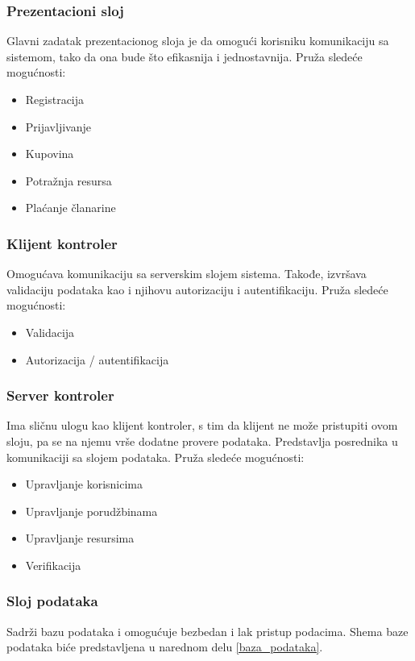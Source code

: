 \documentclass[a4paper]{article}
\begin{document}
\subsubsection{Prezentacioni sloj}
Glavni zadatak prezentacionog sloja je da omogući korisniku komunikaciju sa sistemom, tako da ona bude što efikasnija i jednostavnija. Pruža sledeće mogućnosti:
\begin{itemize}
    \item Registracija
    \item Prijavljivanje
    \item Kupovina
    \item Potražnja resursa
    \item Plaćanje članarine
\end{itemize}

\subsubsection{Klijent kontroler}
Omogućava komunikaciju sa serverskim slojem sistema. Takođe, izvršava validaciju podataka kao i njihovu autorizaciju i autentifikaciju. Pruža sledeće mogućnosti:
\begin{itemize}
    \item Validacija
    \item Autorizacija / autentifikacija
\end{itemize}

\subsubsection{Server kontroler}
Ima sličnu ulogu kao klijent kontroler, s tim da klijent ne može pristupiti ovom sloju, pa se na njemu vrše dodatne provere podataka. Predstavlja posrednika u komunikaciji sa slojem podataka. Pruža sledeće mogućnosti:
\begin{itemize}
    \item Upravljanje korisnicima
    \item Upravljanje porudžbinama
    \item Upravljanje resursima
    \item Verifikacija
\end{itemize}

\subsubsection{Sloj podataka}
Sadrži bazu podataka i omogućuje bezbedan i lak pristup podacima. Shema baze podataka biće predstavljena u narednom delu \ref{baza_podataka}.
\end{document}
